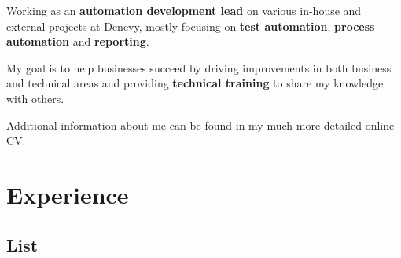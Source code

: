 \documentclass[cv_en.tex]{subfiles}
\begin{document}

\newcommand\minitab[2][l]{\begin{tabular}[b]{#1}#2\end{tabular}}
\newcommand\tnode[2][left]{\tikz[baseline=(n.center)]\node(n)[inner sep=0,outer sep=0,align=#1]{#2};}
\newcommand*{\cventrylogo}[8][.25em]{
  \begin{tabular*}{\textwidth}{l@{\extracolsep{\fill}}r}%
    \tnode{\minitab[l]{
      {\bfseries #4} \\ {\itshape #3\ifthenelse{\equal{#7}{}}{}{, #7}}
    }}
    & 
    \tnode[right]{\minitab[r]{{\bfseries #6} \\ {\itshape #2} \\ #5}} 
      \\%
  \end{tabular*}%
  \ifx&#8&%
    \else{\\\vbox{\small#8}}\fi%
  \par\addvspace{#1}}


\vspace*{-8mm}

Working as an \textbf{automation development lead} on various in-house and external projects at Denevy, mostly focusing on \textbf{test automation}, \textbf{process automation} and \textbf{reporting}. \\

\vspace*{-3mm}

My goal is to help businesses succeed by driving improvements in both business and technical areas and providing \textbf{technical training} to share my knowledge with others. \\

\vspace*{-3mm}

Additional information about me can be found in my much more detailed \href{https://dominik-97.github.io/curriculum-vitae/}{\color[RGB]{69,114,174}online CV}.

\section{Experience}
\subsection{List}

\end{document}
